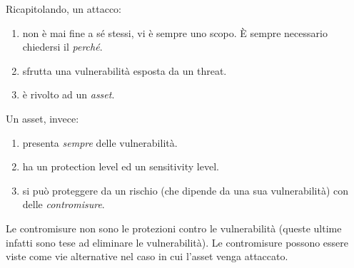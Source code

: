Ricapitolando, un attacco:
\begin{enumerate}
	\item non è mai fine a sé stessi, vi è sempre uno scopo. È sempre necessario chiedersi il \textit{perché}.
	\item sfrutta una vulnerabilità esposta da un threat.
	\item è rivolto ad un \textit{asset}.
\end{enumerate}
Un asset, invece:
\begin{enumerate}
	\item presenta \textit{sempre} delle vulnerabilità.
	\item ha un protection level ed un sensitivity level.
	\item si può proteggere da un rischio (che dipende da una sua vulnerabilità) con delle \textit{contromisure}.
\end{enumerate}
Le contromisure non sono le protezioni contro le vulnerabilità (queste ultime infatti sono tese ad eliminare le vulnerabilità). Le contromisure possono essere viste come vie alternative nel caso in cui l'asset venga attaccato.